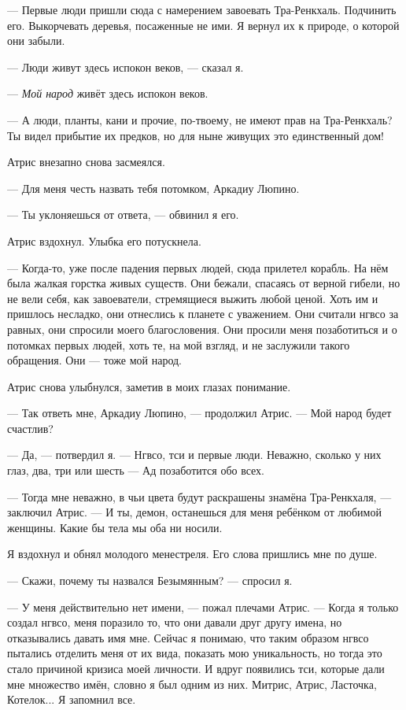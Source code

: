 --- Первые люди пришли сюда с намерением завоевать Тра-Ренкхаль.
Подчинить его.
Выкорчевать деревья, посаженные не ими.
Я вернул их к природе, о которой они забыли.

--- Люди живут здесь испокон веков, --- сказал я.

--- \emph{Мой народ} живёт здесь испокон веков.

--- А люди, планты, кани и прочие, по-твоему, не имеют прав на Тра-Ренкхаль?
Ты видел прибытие их предков, но для ныне живущих это единственный дом!

Атрис внезапно снова засмеялся.

--- Для меня честь назвать тебя потомком, Аркадиу Люпино.

--- Ты уклоняешься от ответа, --- обвинил я его.

Атрис вздохнул.
Улыбка его потускнела.

--- Когда-то, уже после падения первых людей, сюда прилетел корабль.
На нём была жалкая горстка живых существ.
Они бежали, спасаясь от верной гибели, но не вели себя, как завоеватели, стремящиеся выжить любой ценой.
Хоть им и пришлось несладко, они отнеслись к планете с уважением.
Они считали нгвсо за равных, они спросили моего благословения.
Они просили меня позаботиться и о потомках первых людей, хоть те, на мой взгляд, и не заслужили такого обращения.
Они --- тоже мой народ.

Атрис снова улыбнулся, заметив в моих глазах понимание.

--- Так ответь мне, Аркадиу Люпино, --- продолжил Атрис.
--- Мой народ будет счастлив?

--- Да, --- потвердил я.
--- Нгвсо, тси и первые люди.
Неважно, сколько у них глаз, два, три или шесть --- Ад позаботится обо всех.

--- Тогда мне неважно, в чьи цвета будут раскрашены знамёна Тра-Ренкхаля, --- заключил Атрис.
--- И ты, демон, останешься для меня ребёнком от любимой женщины.
Какие бы тела мы оба ни носили.

Я вздохнул и обнял молодого менестреля.
Его слова пришлись мне по душе.

--- Скажи, почему ты назвался Безымянным? --- спросил я.

--- У меня действительно нет имени, --- пожал плечами Атрис.
--- Когда я только создал нгвсо, меня поразило то, что они давали друг другу имена, но отказывались давать имя мне.
Сейчас я понимаю, что таким образом нгвсо пытались отделить меня от их вида, показать мою уникальность, но тогда это стало причиной кризиса моей личности.
И вдруг появились тси, которые дали мне множество имён, словно я был одним из них.
Митрис, Атрис, Ласточка, Котелок...
Я запомнил все.

